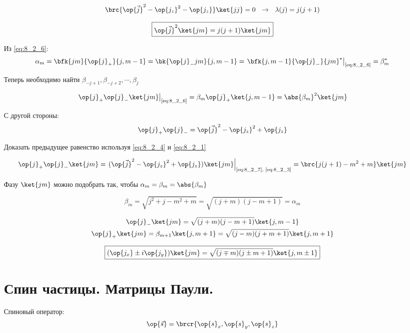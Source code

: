 $$
\brc{\op{\vec{j}}^2 - \op{j_z}^2 - \op{j_z}} \ket{jj} = 0 ~~\rightarrow~~ \lambda(j) = j(j+1)
$$

\begin{equation}
\label{eq:8_2_7}
\boxed {
	\op{\vec{j}}^2 \ket{jm} = j(j+1) \ket{jm}
}
\end{equation}

Из \eqref{eq:8_2_6}:
$$
\alpha_m = \bfk{jm}{\op{j}_{+}}{j, m-1} = \bk{\op{j}_{-}jm}{j, m-1} = \left. \bfk{j,m-1}{\op{j}_{-}}{jm}^* \right|_{\text{\eqref{eq:8_2_6}}} = \beta_m^*
$$

Теперь необходимо найти $\beta_{-j+1}, \beta_{-j+2}, \cdots, \beta_{j}$

$$
\left. \op{j}_{+} \op{j}_{-} \ket{jm} \right|_{\text{\eqref{eq:8_2_6}}} = \beta_m \op{j}_{+} \ket{j, m-1} = \abs{\beta_m}^2 \ket{jm}
$$

С другой стороны:
$$
\op{j}_{+} \op{j}_{-} = \op{\vec{j}}^2 - \op{j_z}^2 + \op{j_z}
$$

\begin{excr}
Доказать предыдущее равенство используя \eqref{eq:8_2_4} и \eqref{eq:8_2_1}
\end{excr}

$$
\op{j}_{+} \op{j}_{-} \ket{jm} = \left. (\op{\vec{j}}^2 - \op{j_z}^2 + \op{j_z}) \ket{jm} \right|_{\text{\eqref{eq:8_2_7}, \eqref{eq:8_2_3}}} = \brc{j(j+1) - m^2 + m} \ket{jm}
$$

Фазу $\ket{jm}$ можно подобрать так, чтобы $\alpha_m = \beta_m  = \abs{\beta_m}$

$$
\beta_m = \sqrt{j^2 + j - m^2 + m} = \sqrt{(j+m)(j-m+1)} = \alpha_m
$$

$$
\begin{gathered}
\op{j}_{-} \ket{jm} = \sqrt{(j+m)(j-m+1)} \ket{j, m-1} \\
\op{j}_{+} \ket{jm} = \beta_{m+1} \ket{j, m+1} = \sqrt{(j-m)(j+m+1)} \ket{j, m+1}
\end{gathered}
$$

\begin{equation}
\label{eq:8_2_8}
\boxed {
	(\op{j_x} \pm i \op{j_y}) \ket{jm} = \sqrt{(j \mp m)(j \pm m + 1)} \ket{j, m \pm 1}
}
\end{equation}


\section{Спин частицы. Матрицы Паули.}

Спиновый оператор:
$$
\op{\vec{s}} = \brcr{\op{s}_x, \op{s}_y, \op{s}_z}
$$


